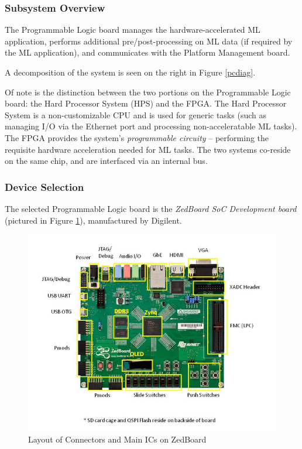 \subsubsection{Subsystem Overview}
The Programmable Logic board manages the hardware-accelerated ML application, performs additional pre/post-processing on ML data (if required by the ML application), and communicates with the Platform Management board.

A decomposition of the system is seen on the right in Figure \ref{pcdiag}.

Of note is the distinction between the two portions on the Programmable Logic board: the Hard Processor System (HPS) and the FPGA. The Hard Processor System is a non-customizable CPU and is used for generic tasks (such as managing I/O via the Ethernet port and processing non-acceleratable ML tasks). The FPGA provides the system's \textit{programmable circuity} -- performing the requisite hardware acceleration needed for ML tasks. The two systems co-reside on the same chip, and are interfaced via an internal bus.

\subsubsection{Device Selection}
The selected Programmable Logic board is the \textit{ZedBoard SoC Development board} (pictured in Figure \ref{zedboard}), manufactured by Digilent. 

\begin{figure}\label{zedboard}
\centering
\includegraphics[width=12.5cm]{img/zedboard_functional_overview.jpg}
\caption{Layout of Connectors and Main ICs on ZedBoard}
\end{figure}

